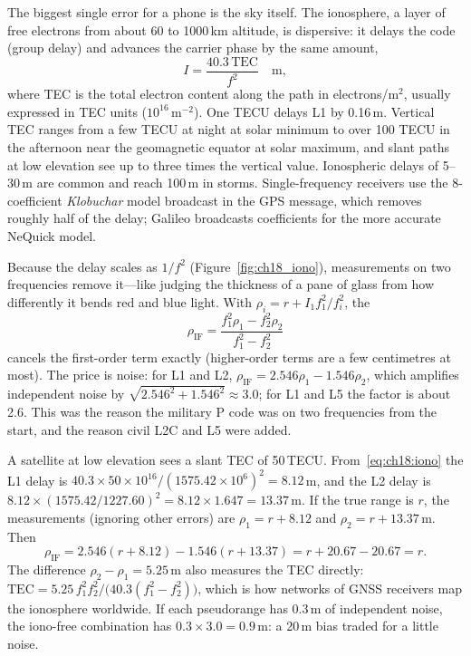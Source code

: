 The biggest single error for a phone is the sky itself. The ionosphere, a layer of free electrons
from about 60 to 1000\,km altitude, is dispersive: it delays the code (group delay) and advances
the carrier phase by the same amount,
\begin{equation}
I=\frac{40.3\,\text{TEC}}{f^2}\quad\text{m},
\label{eq:ch18:iono}
\end{equation}
where TEC is the total electron content along the path in electrons/m$^2$, usually expressed in
TEC units ($10^{16}$\,m$^{-2}$). One TECU delays L1 by 0.16\,m. Vertical TEC ranges from a few
TECU at night at solar minimum to over 100 TECU in the afternoon near the geomagnetic equator at
solar maximum, and slant paths at low elevation see up to three times the vertical value.
Ionospheric delays of 5--30\,m are common and reach 100\,m in storms. Single-frequency receivers
use the 8-coefficient \emph{Klobuchar} model broadcast in the GPS message, which removes
roughly half of the delay; Galileo broadcasts coefficients for the more accurate NeQuick model.

Because the delay scales as $1/f^2$ (Figure~\ref{fig:ch18_iono}), measurements on two frequencies
remove it---like judging the thickness of a pane of glass from how differently it bends red and
blue light. With $\rho_i=r+I_1f_1^2/f_i^2$, the 
\begin{equation}
\rho_{\text{IF}}=\frac{f_1^2\rho_1-f_2^2\rho_2}{f_1^2-f_2^2}
\label{eq:ch18:iflc}
\end{equation}
cancels the first-order term exactly (higher-order terms are a few centimetres at most). The
price is noise: for L1 and L2, $\rho_{\text{IF}}=2.546\rho_1-1.546\rho_2$, which amplifies
independent noise by $\sqrt{2.546^2+1.546^2}\approx3.0$; for L1 and L5 the factor is
about 2.6. This was the reason the military P code was on two frequencies from the start, and
the reason civil L2C and L5 were added.


\begin{worked}
A satellite at low elevation sees a slant TEC of 50\,TECU. From~\eqref{eq:ch18:iono} the L1
delay is $40.3\times50\times10^{16}/(1575.42\times10^6)^2=8.12$\,m, and the L2 delay is
$8.12\times(1575.42/1227.60)^2=8.12\times1.647=13.37$\,m. If the true range is $r$, the
measurements (ignoring other errors) are $\rho_1=r+8.12$ and $\rho_2=r+13.37$\,m. Then
\[
\rho_{\text{IF}}=2.546(r+8.12)-1.546(r+13.37)=r+20.67-20.67=r.
\]
The difference $\rho_2-\rho_1=5.25$\,m also measures the TEC directly:
$\text{TEC}=5.25\,f_1^2f_2^2/\big(40.3(f_1^2-f_2^2)\big)$, which is how networks of GNSS
receivers map the ionosphere worldwide. If each pseudorange has 0.3\,m of independent noise,
the iono-free combination has $0.3\times3.0=0.9$\,m: a 20\,m bias traded for a little noise.
\end{worked}

